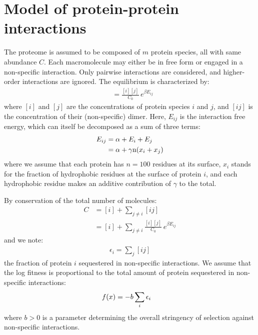\section{Model of protein-protein interactions}
The proteome is assumed to be composed of $m$ protein species, all with same abundance $C$. Each macromolecule may either be in free form or engaged in a non-specific interaction. Only pairwise interactions are considered, and higher-order interactions are ignored.
The equilibrium is characterized by:
\begin{align}
[ij] & = \frac{[i][j]}{C_0} \, e^{\beta E_{ij}}
\end{align}
where $[i]$ and $[j]$ are the concentrations of protein species $i$ and $j$, and $[ij]$ is the concentration of their (non-specific) dimer. Here, $E_{ij}$ is the interaction free energy, which can itself be decomposed as a sum of three terms:
\begin{align}
E_{ij} & = \alpha + E_i + E_j 
\\
& = \alpha + \gamma \text{n} (x_i + x_j)
\end{align}
where we assume that each protein has $n=100$ residues at its surface, $x_i$ stands for the fraction of hydrophobic residues at the surface of protein $i$, and each hydrophobic residue makes an additive contribution of $\gamma$ to the total.

By conservation of the total number of molecules:
\begin{align}
C & = [i] + \sum\limits_{j \neq i} [ij] \\
& = [i] + \sum\limits_{j \neq i} \frac{[i][j]}{C_0} \, e^{\beta E_{ij}}
\end{align}
and we note:
\begin{align}
\epsilon_i = \sum_j [ij]
\end{align}
the fraction of protein $i$ sequestered in non-specific interactions.
We assume that the log fitness is proportional to the total amount of protein sequestered in non-specific interactions:
\begin{align}
f (x) & = -b \sum_i \epsilon_i
\end{align}
where $b>0$ is a parameter determining the overall stringency of selection against non-specific interactions.

